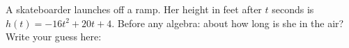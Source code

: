\begin{hookbox}
A skateboarder launches off a ramp. Her height in feet after $t$ seconds is
$h(t)=-16t^2+20t+4$. Before any algebra: about how long is she in the air?
Write your guess here: \blank{3cm}
\end{hookbox}
